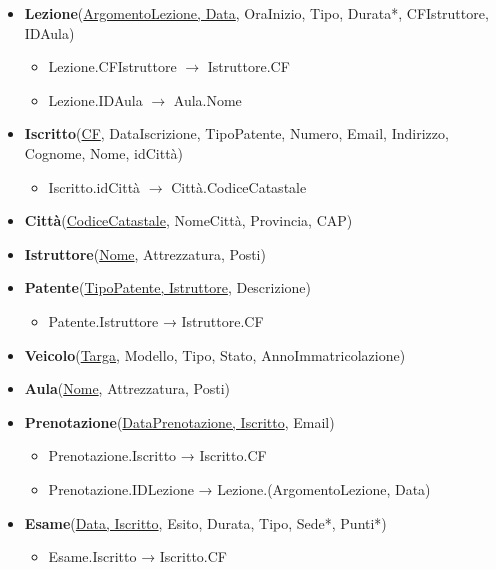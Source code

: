 \documentclass[10pt,twoside]{article}
\begin{document}
{{        \begin{itemize}
            \item \textbf{Lezione}(\underline{ArgomentoLezione, Data}, OraInizio, Tipo, Durata*, CFIstruttore, IDAula)
            \begin{itemize}
                \item Lezione.CFIstruttore  $\rightarrow$ Istruttore.CF
                \item Lezione.IDAula  $\rightarrow$ Aula.Nome
            \end{itemize}
            \item \textbf{Iscritto}(\underline{CF}, DataIscrizione, TipoPatente, Numero, Email, Indirizzo, Cognome, Nome, idCittà)
            \begin{itemize}
                \item Iscritto.idCittà $\rightarrow$ Città.CodiceCatastale
            \end{itemize}
            \item \textbf{Città}(\underline{CodiceCatastale}, NomeCittà, Provincia, CAP)
            \item \textbf{Istruttore}(\underline{Nome}, Attrezzatura, Posti)
            \item \textbf{Patente}(\underline{TipoPatente, Istruttore}, Descrizione)
            \begin{itemize}
                \item Patente.Istruttore → Istruttore.CF
            \end{itemize}
            \item \textbf{Veicolo}(\underline{Targa}, Modello, Tipo, Stato, AnnoImmatricolazione)
            \item \textbf{Aula}(\underline{Nome}, Attrezzatura, Posti)
            \item \textbf{Prenotazione}(\underline{DataPrenotazione, Iscritto}, Email)
            \begin{itemize}
                \item Prenotazione.Iscritto → Iscritto.CF
                \item Prenotazione.IDLezione → Lezione.(ArgomentoLezione, Data)
            \end{itemize}
            \item \textbf{Esame}(\underline{Data, Iscritto}, Esito, Durata, Tipo, Sede*, Punti*)
            \begin{itemize}
                \item Esame.Iscritto → Iscritto.CF

\end{itemize}
\end{itemize}}}
\end{document}
